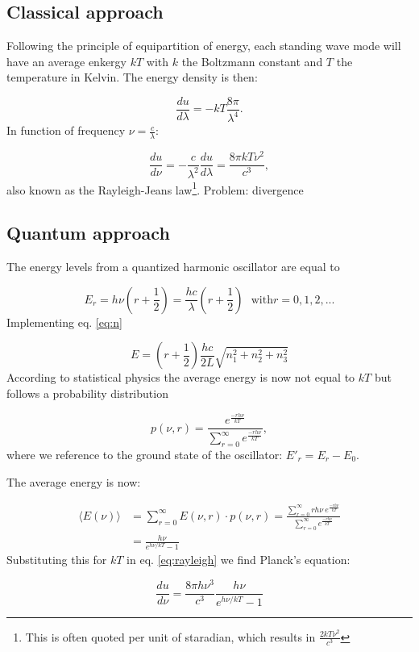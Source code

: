 \begin{appendices}
\subsection{Classical approach}
Following the principle of equipartition of energy, each standing wave mode will have an average enkergy $kT$ with $k$ the Boltzmann constant and $T$ the temperature in Kelvin. The energy density is then:

\begin{equation}
\frac{du}{d\lambda} = -kT \frac{8\pi}{\lambda^4}.
\end{equation}
In function of frequency $\nu = \frac{c}{\lambda}$:

\begin{equation}
\label{eq:rayleigh}
\frac{du}{d\nu} = -\frac{c}{\lambda^2} \frac{du}{d\lambda} = \frac{8\pi kT \nu^2}{c^3},
\end{equation}
also known as the Rayleigh-Jeans law\footnote{This is often quoted per unit of staradian, which results in $\frac{2 kT \nu^2}{c^3}$}. Problem: divergence

\subsection{Quantum approach}
The energy levels from a quantized harmonic oscillator are equal to

\begin{equation}
E_r = h\nu\left(r+\frac{1}{2}\right) = \frac{hc}{\lambda}\left(r+\frac{1}{2}\right) \ \ \ \textrm{with} r = 0,1,2,...
\end{equation}
Implementing eq. \ref{eq:n}

\begin{equation}
E = \left(r+\frac{1}{2}\right) \frac{hc}{2L}\sqrt{n_1^2 + n_2^2 + n_3^2}
\end{equation}
According to statistical physics the average energy is now not equal to $kT$ but follows a probability distribution

\begin{equation}
p(\nu,r) = \frac{e^{\frac{-rh\nu}{kT}}}{\sum_{r=0}^\infty e^{\frac{-rh\nu}{kT}}},
\end{equation}
where we reference to the ground state of the oscillator: $E'_r = E_r - E_0$.

The average energy is now:

\begin{equation}
\begin{split}
\langle E(\nu)\rangle &= \sum_{r=0}^\infty E(\nu,r) \cdot p(\nu,r) = \frac{\sum_{r=0}^\infty r h \nu \  e^{\frac{-rh\nu}{kT}}}{\sum_{r=0}^\infty e^{\frac{-rh\nu}{kT}}}\\
&= \frac{h\nu}{e^{h\nu/kT} - 1}
\end{split}
\end{equation}
Substituting this for $kT$ in eq. \ref{eq:rayleigh} we find Planck's equation:

\begin{equation}
\frac{du}{d\nu} = \frac{8\pi h \nu^3}{c^3} \frac{h\nu}{e^{h\nu/kT} - 1}
\end{equation}

\end{appendices}